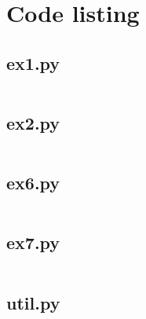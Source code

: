 \documentclass[10pt,a4paper,twoside,twocolumn]{article}
\begin{document}
\onecolumn
\appendixpage
\appendix

\section{Code listing}

\subsection{ex1.py}\label{app:ex1}
\inputminted{python}{../src/ex1.py}

\subsection{ex2.py}\label{app:ex2}
\inputminted{python}{../src/ex2.py}

\subsection{ex6.py}\label{app:ex6}
\inputminted{python}{../src/ex6.py}

\subsection{ex7.py}\label{app:ex7}
\inputminted{python}{../src/ex7.py}

\subsection{util.py}\label{app:util}
\inputminted{python}{../src/util.py}
\end{document}
